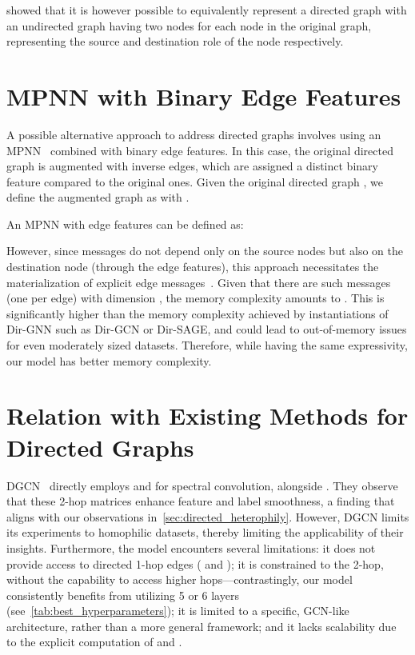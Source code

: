 \documentclass{article}
\newcommand\oursacro{Dir-GNN}
\theoremstyle{plain}
\theoremstyle{definition}
\theoremstyle{remark}
\begin{document}
\citet{Kollias2022DirectedGA} showed that it is however possible to equivalently represent a directed graph with an undirected graph having two nodes for each node in the original graph, representing the source and destination role of the node respectively.

\section{MPNN with Binary Edge Features} \label{sec:mpnn_binary_features}
A possible alternative approach to address directed graphs involves using an MPNN~\cite{gilmer2017neural} combined with binary edge features. In this case, the original directed graph is augmented with inverse edges, which are assigned a distinct binary feature compared to the original ones. Given the original directed graph , we define the augmented graph as  with .

An MPNN with edge features can be defined as:



However, since messages do not depend only on the source nodes but also on the destination node (through the edge features), this approach necessitates the materialization of explicit edge messages~\cite{tailor2022adaptive}. Given that there are  such messages (one per edge) with dimension , the memory complexity amounts to . This is significantly higher than the  memory complexity achieved by instantiations of \oursacro{} such as Dir-GCN or Dir-SAGE, and could lead to out-of-memory issues for even moderately sized datasets. Therefore, while having the same expressivity, our model has better memory complexity. 

\section{Relation with Existing Methods for Directed Graphs} \label{sec:comparison_with_directed_graph_methods}
DGCN~\cite{dgcn} directly employs  and  for spectral convolution, alongside . They observe that these 2-hop matrices enhance feature and label smoothness, a finding that aligns with our observations in~\cref{sec:directed_heterophily}. However, DGCN limits its experiments to homophilic datasets, thereby limiting the applicability of their insights. Furthermore, the model encounters several limitations: it does not provide access to directed 1-hop edges ( and ); it is constrained to the 2-hop, without the capability to access higher hops—contrastingly, our model consistently benefits from utilizing 5 or 6 layers (see~\cref{tab:best_hyperparameters}); it is limited to a specific, GCN-like architecture, rather than a more general framework; and it lacks scalability due to the explicit computation of  and .
\end{document}
